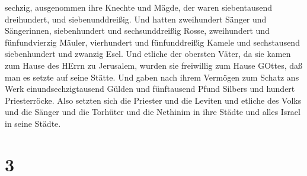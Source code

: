 sechzig,  ausgenommen ihre Knechte und Mägde, der waren
siebentausend dreihundert, und siebenunddreißig. Und hatten zweihundert
Sänger und Sängerinnen,  siebenhundert und sechsunddreißig
Rosse, zweihundert und fünfundvierzig Mäuler,  vierhundert
und fünfunddreißig Kamele und sechstausend siebenhundert und zwanzig
Esel.  Und etliche der obersten Väter, da sie kamen zum
Hause des HErrn zu Jerusalem, wurden sie freiwillig zum Hause GOttes,
daß man es setzte auf seine Stätte.  Und gaben nach ihrem
Vermögen zum Schatz ans Werk einundsechzigtausend Gülden und fünftausend
Pfund Silbers und hundert Priesterröcke.  Also setzten sich
die Priester und die Leviten und etliche des Volks und die Sänger und
die Torhüter und die Nethinim in ihre Städte und alles Israel in seine
Städte.

\hypertarget{section-2}{%
\section{3}\label{section-2}}

